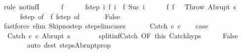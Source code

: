 \begin{isabellebody}
\ {\isacharparenleft}rule\ not{\isacharunderscore}infI{\isacharparenright}\isanewline
\ \ \ \ \isamarkupfalse%
\ f\isanewline
\ \ \ \ \isamarkupfalse%
\ f{\isacharunderscore}step{\isacharcolon}\ {\isachardoublequoteopen}{\isasymAnd}i{\isachardot}\ {\isasymGamma}{\isasymturnstile}f\ i\ {\isasymrightarrow}\ f\ {\isacharparenleft}Suc\ i{\isacharparenright}{\isachardoublequoteclose}\isanewline
\ \ \ \ \isamarkupfalse%
\ f{\isacharunderscore}{}{\isacharcolon}\ {\isachardoublequoteopen}f\ {}\ {\isacharequal}\ {\isacharparenleft}Throw{\isacharcomma}\ Abrupt\ s{\isacharparenright}{\isachardoublequoteclose}\ \isanewline
\ \ \ \ \isamarkupfalse%
\ f{\isacharunderscore}step\ {\isacharbrackleft}of\ {}{\isacharbrackright}\ f{\isacharunderscore}{}\ f{\isacharunderscore}step\ {\isacharbrackleft}of\ {}{\isacharbrackright}\isanewline
\ \ \ \ \isamarkupfalse%
\ False\isanewline
\ \ \ \ \ \ \isamarkupfalse%
\ {\isacharparenleft}fastforce\ elim{\isacharcolon}\ Skip{\isacharunderscore}no{\isacharunderscore}step\ step{\isacharunderscore}elim{\isacharunderscore}cases{\isacharparenright}\isanewline
\ \ \isamarkupfalse%
\isanewline
{}\isamarkupfalse%
\isanewline
\ \ \isamarkupfalse%
\ {\isacharparenleft}Catch\ c\ c\isanewline
\ \ \isamarkupfalse%
\ {\isacharquery}case\isanewline
\ \ \isamarkupfalse%
\ \isanewline
\ \ \ \ \isamarkupfalse%
\ {\isachardoublequoteopen}{\isasymGamma}{\isasymturnstile}\ {\isacharparenleft}Catch\ c\ c\ Abrupt\ s{\isacharparenright}\ {\isasymrightarrow}\ {\isasymdots}{\isacharparenleft}{\isasyminfinity}{\isacharparenright}{\isachardoublequoteclose}\isanewline
\ \ \ \ \isamarkupfalse%
\ split{\isacharunderscore}inf{\isacharunderscore}Catch\ {\isacharbrackleft}OF\ this{\isacharbrackright}\ Catch{\isachardot}hyps\isanewline
\ \ \ \ \isamarkupfalse%
\ False\isanewline
\ \ \ \ \ \ \isamarkupfalse%
\ {\isacharparenleft}auto\ dest{\isacharcolon}\ steps{\isacharunderscore}Abrupt{\isacharunderscore}prop{\isacharparenright}\isanewline
\ \ \isamarkupfalse%
\ \ \isanewline
{}\isamarkupfalse%
%
\endisatagproof
{\isafoldproof}%
%
\isadelimproof
\isanewline
%
\endisadelimproof
\isanewline
\isanewline

\end{isabellebody}
